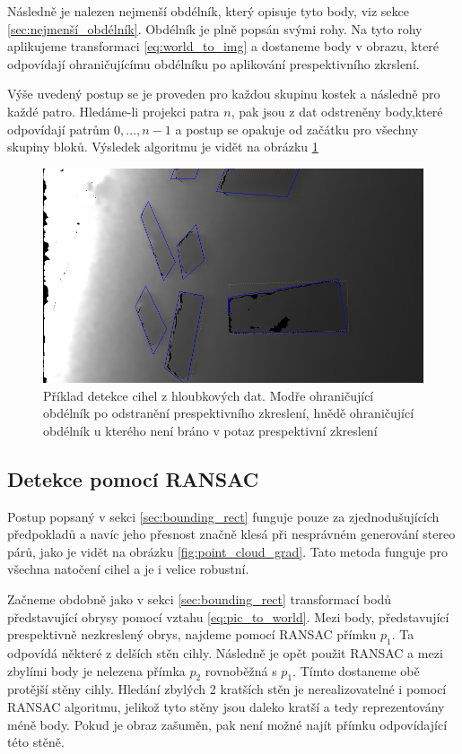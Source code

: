 \documentclass[twoside]{ctuthesis}
\begin{document}
Následně je nalezen nejmenší obdélník, který opisuje tyto body, viz sekce \ref{sec:nejmenší_obdélník}. Obdélník je plně popsán svými rohy. Na tyto rohy aplikujeme transformaci \ref{eq:world_to_img} a dostaneme body v obrazu, které odpovídají ohraničujícímu obdélníku po aplikování prespektivního zkrslení.

Výše uvedený postup se je proveden pro každou skupinu kostek a následně pro každé patro. Hledáme-li projekci patra $n$, pak jsou z dat odstreněny body,které odpovídají patrům $0,...,n -1$ a postup se opakuje od začátku pro všechny skupiny bloků. Výsledek algoritmu je vidět na obrázku \ref{fig:bb_clasic}


\begin{figure}
    \centering
    \includegraphics[width = 0.7\linewidth]{pictures/detekce_bb.png}
    \caption{Příklad detekce cihel z hloubkových dat. Modře ohraničující obdélník po odstranění prespektivního zkreslení, hnědě ohraničující obdélník u kterého není bráno v potaz prespektivní zkreslení}
    \label{fig:bb_clasic}
\end{figure}

\subsection{Detekce pomocí RANSAC}
Postup popsaný v sekci \ref{sec:bounding_rect} funguje pouze za zjednodušujících předpokladů a navíc jeho přesnost značně klesá při nesprávném generování stereo párů, jako je vidět na obrázku \ref{fig:point_cloud_grad}. Tato metoda funguje pro všechna natočení cihel a je i velice robustní.

Začneme obdobně jako v sekci \ref{sec:bounding_rect} transformací bodů představující obrysy pomocí vztahu \ref{eq:pic_to_world}. Mezi body, představující prespektivně nezkreslený obrys, najdeme pomocí RANSAC přímku $p_1$. Ta odpovídá některé z delších stěn cihly. Následně je opět použit RANSAC a mezi zbylími body je nelezena přímka $p_2$ rovnoběžná s $p_1$. Tímto dostaneme obě protější stěny cihly. Hledání zbylých 2 kratších stěn je nerealizovatelné i pomocí RANSAC algoritmu, jelikož tyto stěny jsou daleko kratší a tedy reprezentovány méně body. Pokud je obraz zašuměn, pak není možné najít přímku odpovídající této stěně.
\end{document}
